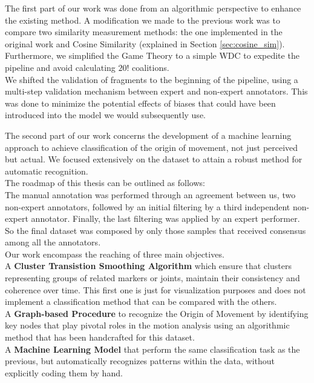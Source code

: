 The first part of our work was done from an algorithmic perspective to enhance the existing method.
A modification we made to the previous work was to compare two similarity measurement methods: the one implemented in the original work and Cosine Similarity (explained in Section \ref{sec:cosine_sim}).\\
Furthermore, we simplified the Game Theory to a simple WDC to expedite the pipeline and avoid calculating $20!$ coalitions.\\
We shifted the validation of fragments to the beginning of the pipeline, using a multi-step validation mechanism between expert and non-expert annotators. 
This was done to minimize the potential effects of biases that could have been introduced into the model we would subsequently use.

The second part of our work concerns the development of a machine learning approach to achieve classification of the origin of movement, not just perceived but actual. 
We focused extensively on the dataset to attain a robust method for automatic recognition.\\

The roadmap of this thesis can be outlined as follows: \\
The manual annotation was performed through an agreement between us, two non-expert annotators, followed by an initial filtering by a third independent non-expert annotator.
Finally, the last filtering was applied by an expert performer.
So the final dataset was composed by only those samples that received consensus among all the annotators.
\\
Our work encompass the reaching of three main objectives.\\
A \textbf{Cluster Transistion Smoothing Algorithm} which ensure that clusters representing groups of related markers or joints, maintain their consistency and coherence over time.
This first one is just for visualization purposes and does not implement a classification method that can be compared with the others.\\
A \textbf{Graph-based Procedure} to recognize the Origin of Movement by identifying key nodes that play pivotal roles in the motion analysis using an algorithmic method that has been handcrafted for this dataset.\\
A \textbf{Machine Learning Model} that perform the same classification task as the previous, but automatically recognizes patterns within the data, without explicitly coding them by hand.

